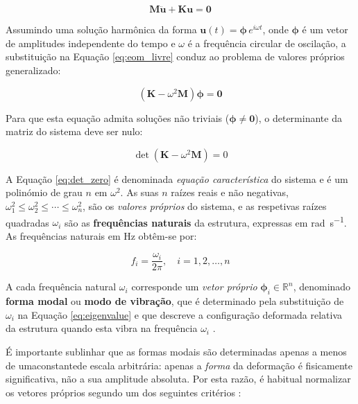 \documentclass[a4paper,fleqn]{cas-sc}
\begin{document}
\begin{equation}
    \mathbf{M}\ddot{\mathbf{u}} + \mathbf{K}\mathbf{u} = \mathbf{0}
    \label{eq:eom_livre}
\end{equation}

Assumindo uma solução harmônica da forma $\mathbf{u}(t) = \boldsymbol{\phi} \, e^{i\omega t}$, onde $\boldsymbol{\phi}$ é um vetor de amplitudes independente do tempo e $\omega$ é a frequência circular de oscilação, a substituição na Equação \eqref{eq:eom_livre} conduz ao problema de valores próprios generalizado:

\begin{equation}
    \left( \mathbf{K} - \omega^2 \mathbf{M} \right) \boldsymbol{\phi} 
    = \mathbf{0}
    \label{eq:eigenvalue}
\end{equation}

Para que esta equação admita soluções não triviais ($\boldsymbol{\phi} \neq \mathbf{0}$), o determinante da matriz do sistema deve ser nulo:

\begin{equation}
    \det\left( \mathbf{K} - \omega^2 \mathbf{M} \right) = 0
    \label{eq:det_zero}
\end{equation}

A Equação \eqref{eq:det_zero} é denominada \textit{equação característica} do sistema e é um polinómio de grau $n$ em $\omega^2$. As suas $n$ raízes reais e não negativas, $\omega_1^2 \leq \omega_2^2 \leq \cdots \leq \omega_n^2$, são os \textit{valores próprios} do sistema, e as respetivas raízes quadradas $\omega_i$ são as \textbf{frequências naturais} da estrutura, expressas em \si{\radian\per\second}. As frequências naturais em \si{\hertz} obtêm-se por:

\begin{equation}
    f_i = \frac{\omega_i}{2\pi}, \quad i = 1, 2, \ldots, n
    \label{eq:freq_hz}
\end{equation}

A cada frequência natural $\omega_i$ corresponde um \textit{vetor próprio} $\boldsymbol{\phi}_i \in \mathbb{R}^n$, denominado \textbf{forma modal} ou \textbf{modo de vibração}, que é determinado pela substituição de $\omega_i$ na Equação \eqref{eq:eigenvalue} e que descreve a configuração deformada relativa da estrutura quando esta vibra na frequência $\omega_i$ \cite{Ewins2000, Maia1997}.

É importante sublinhar que as formas modais são determinadas apenas a menos de umaconstantede escala arbitrária: apenas a \textit{forma} da deformação é fisicamente significativa, não a sua amplitude absoluta. Por esta razão, é habitual normalizar os vetores próprios segundo um dos seguintes critérios \cite{Craig2006}:
\end{document}
